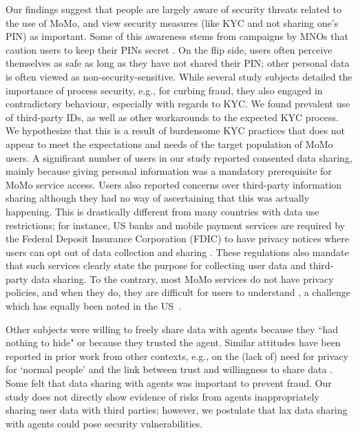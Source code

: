 Our findings suggest that people are largely aware of  security threats related to the use of MoMo, and view security measures (like KYC and not sharing one's PIN) as important. 
Some of this awareness stems from campaigns by MNOs that caution users to keep their PINs secret \cite{mckee2015doing}. On the flip side, users often perceive themselves as safe as long as they have not shared their PIN; other personal data is often viewed as non-security-sensitive. While several study subjects detailed the importance of process security, e.g., for curbing fraud, they also engaged in contradictory behaviour, especially with regards to KYC. 
We found prevalent use of third-party IDs, as well as other workarounds to the expected KYC process. 
We hypothesize that this is a result of burdensome KYC practices that does not appear to meet the expectations and needs of the target population of MoMo users.   
 A significant number of users in our study reported consented data sharing,  mainly because giving personal information was a mandatory prerequisite for MoMo service access. Users also reported concerns over third-party information sharing although they had no way of ascertaining that this was actually happening. This is drastically different from many countries with data use restrictions; for instance,  US banks and mobile payment services are required by the Federal Deposit Insurance Corporation (FDIC) to have privacy notices where users can opt out of data collection and sharing \cite{bowers2017regulators}. 
These regulations also mandate that such services clearly state the purpose for collecting  user data and third-party data sharing. To the contrary, most MoMo services do not have privacy policies, and when they do, they are difficult for users to understand \cite{bowers2017regulators,munyendo2022desperate}, a challenge which has equally been noted in the US~\cite{schaub2015design}.

Other subjects were willing to freely share data with  agents because they ``had nothing to hide" or because they trusted the agent. 
Similar attitudes have been reported in prior work from other contexts, e.g., on the (lack of) need for privacy for `normal people' \cite{gaw2006secrecy} and the link between trust and willingness to share data   \cite{das2014effect,yisa2023investigating}.
Some felt that data sharing with agents was important to prevent fraud. Our study does not directly show evidence of risks from agents inappropriately sharing user data with third parties; however, we postulate that lax data sharing with agents could pose security vulnerabilities. 

